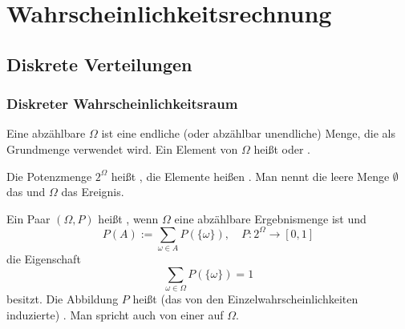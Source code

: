 
\chapter{Wahrscheinlichkeitsrechnung}

\section{Diskrete Verteilungen}

\subsection{Diskreter Wahrscheinlichkeitsraum}

\begin{definition}\mbox{}\newline%
%
Eine abzählbare  $\Omega$ ist eine endliche
(oder abzählbar unendliche) Menge, die als Grundmenge verwendet wird.
Ein Element von $\Omega$ heißt  oder
.

Die Potenzmenge $2^\Omega$ heißt , die
Elemente heißen .
Man nennt die leere Menge $\emptyset$ das  und $\Omega$
das  Ereignis.
\end{definition}

\begin{definition}\mbox{}\newline%
%
Ein Paar $(\Omega,P)$ heißt , wenn
$\Omega$ eine abzählbare Ergebnismenge ist und%
\begin{equation}
P(A):=\sum_{\omega\in A} P(\{\omega\}),\quad P\colon 2^\Omega\to [0,1]
\end{equation}
die Eigenschaft
\begin{equation}
\sum_{\omega\in\Omega} P(\{\omega\})=1
\end{equation}
besitzt. Die Abbildung $P$ heißt (das von den
Einzelwahrscheinlichkeiten induzierte) .
Man spricht auch von einer  auf $\Omega$.
\end{definition}


